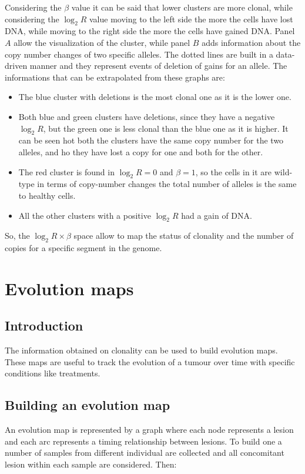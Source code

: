  Considering the $\beta$ value it can be said that lower clusters are more clonal, while considering the $\log_2 R$ value moving to the left side the more the cells have lost DNA, while moving to the right side the more the cells have gained DNA.
  Panel $A$ allow the visualization of the cluster, while panel $B$ adds information about the copy number changes of two specific alleles.
  The dotted lines are built in a data-driven manner and they represent events of deletion of gains for an allele.
  The informations that can be extrapolated from these graphs are:

  \begin{multicols}{2}
    \begin{itemize}
    \item The blue cluster with deletions is the most clonal one as it is the lower one.
    \item Both blue and green clusters have deletions, since they have a negative $\log_2 R$, but the green one is less clonal than the blue one as it is higher.
      It can be seen hot both the clusters have the same copy number for the two alleles, and ho they have lost a copy for one and both for the other.
    \item The red cluster is found in $\log_2 R = 0$ and $\beta = 1$, so the cells in it are wild-type in terms of copy-number changes the total number of alleles is the same to healthy cells.
    \item All the other clusters with a positive $\log_2 R$ had a gain of DNA.
    \end{itemize}
  \end{multicols}

  So, the $\log_2 R\times\beta$ space allow to map the status of clonality and the number of copies for a specific segment in the genome.

\section{Evolution maps}

  \subsection{Introduction}
  The information obtained on clonality can be used to build evolution maps.
  These maps are useful to track the evolution of a tumour over time with specific conditions like treatments.

  \subsection{Building an evolution map}
  An evolution map is represented by a graph where each node represents a lesion and each arc represents a timing relationship between lesions.
  To build one a number of samples from different individual are collected and all concomitant lesion within each sample are considered.
  Then:

